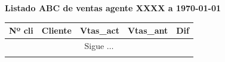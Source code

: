 \documentclass[a4paper]{article}
\begin{document}
\begin{center}
\textbf{Listado ABC de ventas agente XXXX a {\today}}
\small
\begin{longtable}{llrrr}
\toprule
\textbf{Nº cli} & \textbf{Cliente}&\textbf{Vtas\_act}&\textbf{Vtas\_ant}&\textbf{Dif}\\
\toprule
\endhead
\multicolumn{5}{c}{Sigue $\ldots$}\\
\endfoot
\endlastfoot

\bottomrule
\end{longtable}
\end{center}
\end{document}
